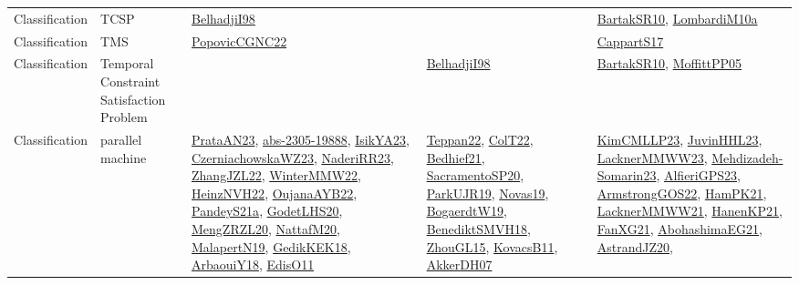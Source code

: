 {\begin{longtable}{lp{3cm}>{\raggedright}p{6cm}>{\raggedright}p{6cm}p{8cm}}
Classification & TCSP & \href{articles/BelhadjiI98.pdf}{BelhadjiI98}\cite{BelhadjiI98} &  & \href{articles/BartakSR10.pdf}{BartakSR10}\cite{BartakSR10}, \href{articles/LombardiM10a.pdf}{LombardiM10a}\cite{LombardiM10a}\\
Classification & TMS & \href{papers/PopovicCGNC22.pdf}{PopovicCGNC22}\cite{PopovicCGNC22} &  & \href{papers/CappartS17.pdf}{CappartS17}\cite{CappartS17}\\
Classification & Temporal Constraint Satisfaction Problem &  & \href{articles/BelhadjiI98.pdf}{BelhadjiI98}\cite{BelhadjiI98} & \href{articles/BartakSR10.pdf}{BartakSR10}\cite{BartakSR10}, \href{papers/MoffittPP05.pdf}{MoffittPP05}\cite{MoffittPP05}\\
Classification & parallel machine & \href{articles/PrataAN23.pdf}{PrataAN23}\cite{PrataAN23}, \href{articles/abs-2305-19888.pdf}{abs-2305-19888}\cite{abs-2305-19888}, \href{articles/IsikYA23.pdf}{IsikYA23}\cite{IsikYA23}, \href{articles/CzerniachowskaWZ23.pdf}{CzerniachowskaWZ23}\cite{CzerniachowskaWZ23}, \href{articles/NaderiRR23.pdf}{NaderiRR23}\cite{NaderiRR23}, \href{papers/ZhangJZL22.pdf}{ZhangJZL22}\cite{ZhangJZL22}, \href{papers/WinterMMW22.pdf}{WinterMMW22}\cite{WinterMMW22}, \href{articles/HeinzNVH22.pdf}{HeinzNVH22}\cite{HeinzNVH22}, \href{papers/OujanaAYB22.pdf}{OujanaAYB22}\cite{OujanaAYB22}, \href{articles/PandeyS21a.pdf}{PandeyS21a}\cite{PandeyS21a}, \href{papers/GodetLHS20.pdf}{GodetLHS20}\cite{GodetLHS20}, \href{articles/MengZRZL20.pdf}{MengZRZL20}\cite{MengZRZL20}, \href{papers/NattafM20.pdf}{NattafM20}\cite{NattafM20}, \href{papers/MalapertN19.pdf}{MalapertN19}\cite{MalapertN19}, \href{articles/GedikKEK18.pdf}{GedikKEK18}\cite{GedikKEK18}, \href{papers/ArbaouiY18.pdf}{ArbaouiY18}\cite{ArbaouiY18}, \href{papers/EdisO11.pdf}{EdisO11}\cite{EdisO11} & \href{papers/Teppan22.pdf}{Teppan22}\cite{Teppan22}, \href{articles/ColT22.pdf}{ColT22}\cite{ColT22}, \href{articles/Bedhief21.pdf}{Bedhief21}\cite{Bedhief21}, \href{articles/SacramentoSP20.pdf}{SacramentoSP20}\cite{SacramentoSP20}, \href{papers/ParkUJR19.pdf}{ParkUJR19}\cite{ParkUJR19}, \href{articles/Novas19.pdf}{Novas19}\cite{Novas19}, \href{papers/BogaerdtW19.pdf}{BogaerdtW19}\cite{BogaerdtW19}, \href{papers/BenediktSMVH18.pdf}{BenediktSMVH18}\cite{BenediktSMVH18}, \href{papers/ZhouGL15.pdf}{ZhouGL15}\cite{ZhouGL15}, \href{articles/KovacsB11.pdf}{KovacsB11}\cite{KovacsB11}, \href{papers/AkkerDH07.pdf}{AkkerDH07}\cite{AkkerDH07} & \href{papers/KimCMLLP23.pdf}{KimCMLLP23}\cite{KimCMLLP23}, \href{papers/JuvinHHL23.pdf}{JuvinHHL23}\cite{JuvinHHL23}, \href{articles/LacknerMMWW23.pdf}{LacknerMMWW23}\cite{LacknerMMWW23}, \href{papers/Mehdizadeh-Somarin23.pdf}{Mehdizadeh-Somarin23}\cite{Mehdizadeh-Somarin23}, \href{articles/AlfieriGPS23.pdf}{AlfieriGPS23}\cite{AlfieriGPS23}, \href{papers/ArmstrongGOS22.pdf}{ArmstrongGOS22}\cite{ArmstrongGOS22}, \href{articles/HamPK21.pdf}{HamPK21}\cite{HamPK21}, \href{papers/LacknerMMWW21.pdf}{LacknerMMWW21}\cite{LacknerMMWW21}, \href{papers/HanenKP21.pdf}{HanenKP21}\cite{HanenKP21}, \href{articles/FanXG21.pdf}{FanXG21}\cite{FanXG21}, \href{articles/AbohashimaEG21.pdf}{AbohashimaEG21}\cite{AbohashimaEG21}, \href{articles/AstrandJZ20.pdf}{AstrandJZ20}\cite{AstrandJZ20}, 
\end{longtable}}

